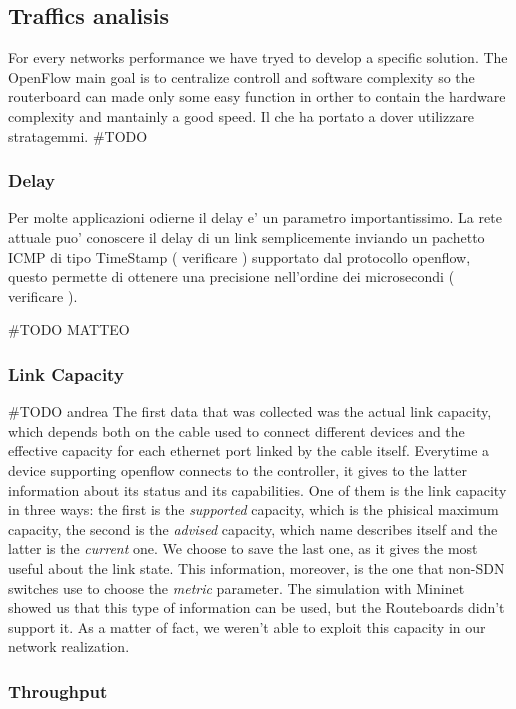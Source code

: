 \documentclass[conference,10pt]{IEEEtran}
\begin{document}
  \subsection{Traffics analisis}\label{subsec:traf}
  For every networks performance we have tryed to develop a specific solution. The OpenFlow main goal is to centralize controll and software
  complexity so the routerboard can made only some easy function in orther to contain the hardware complexity and mantainly a good speed.
  Il che ha portato a dover utilizzare stratagemmi.
  \#TODO %
    \subsubsection{Delay}

	  Per molte applicazioni odierne il delay e' un parametro importantissimo.
    La rete attuale puo' conoscere il delay di un link semplicemente inviando un pachetto ICMP di tipo TimeStamp ( verificare )
    supportato dal protocollo openflow, questo permette di ottenere una precisione nell'ordine dei microsecondi ( verificare ).


    \#TODO MATTEO
		\subsubsection{Link Capacity}

		\#TODO andrea
		The first data that was collected was the actual link capacity, which depends both on the cable used to connect
		different devices and the effective capacity for each ethernet port linked by the cable itself. Everytime a device supporting
		openflow connects to the controller, it gives to the latter information about its status and its capabilities. One of them is
		the link capacity in three ways: the first is the \textit{supported} capacity, which is the phisical maximum capacity, the second is the
		\textit{advised} capacity, which name describes itself and the latter is the \textit{current} one. We choose to save the last one,
		as it gives the most useful about the link state. This information, moreover, is the one that non-SDN switches use to choose the \textit{metric}
		parameter. The simulation with Mininet showed us that this type of information can be used, but the Routeboards didn't support it.
		As a matter of fact, we weren't able to exploit this capacity in our network realization.
    \subsubsection{Throughput}
\end{document}
